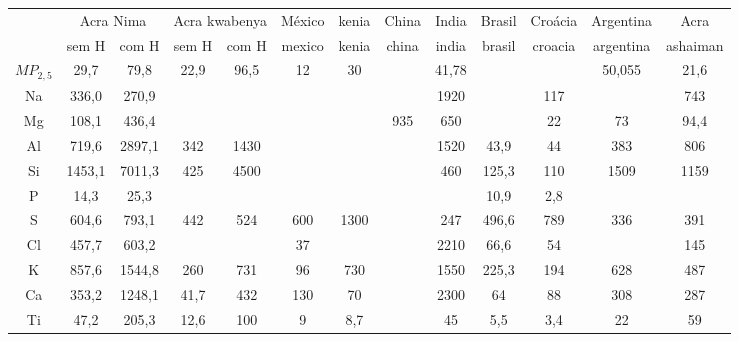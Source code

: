 
\begin{tabular}{ccccccccccccc}
\hline
& \multicolumn{2}{c}{Acra Nima} & \multicolumn{2}{c}{Acra kwabenya} & México & kenia & China & India & Brasil & Croácia & Argentina & Acra \\
& sem H & com H & sem H & com H & mexico & kenia & china & india & brasil & croacia & argentina & ashaiman \\
\hline
$MP_{2,5}$& 29,7       & 79,8       & 22,9             & 96,5         & 12       & 30    &       & 41,78 &        &         & 50,055    & 21,6     \\
Na        & 336,0      & 270,9      &                  &              &        &       &       & 1920  &        & 117     &           & 743      \\
Mg        & 108,1      & 436,4      &                  &              &        &       & 935   & 650   &        & 22      & 73        & 94,4     \\
Al        & 719,6      & 2897,1     & 342              & 1430         &        &       &       & 1520  & 43,9   & 44      & 383       & 806      \\
Si        & 1453,1     & 7011,3     & 425              & 4500         &        &       &       & 460   & 125,3  & 110     & 1509      & 1159     \\
P         & 14,3       & 25,3       &                  &              &        &       &       &       & 10,9   & 2,8     &           &          \\
S         & 604,6      & 793,1      & 442              & 524          & 600    & 1300  &       & 247   & 496,6  & 789     & 336       & 391      \\
Cl        & 457,7      & 603,2      &                  &              & 37     &       &       & 2210  & 66,6   & 54      &           & 145      \\
K         & 857,6      & 1544,8     & 260              & 731          & 96     & 730   &       & 1550  & 225,3  & 194     & 628       & 487      \\
Ca        & 353,2      & 1248,1     & 41,7             & 432          & 130    & 70    &       & 2300  & 64     & 88      & 308       & 287      \\
Ti        & 47,2       & 205,3      & 12,6             & 100          & 9      & 8,7   &       & 45    & 5,5    & 3,4     & 22        & 59       \\

\end{tabular}
